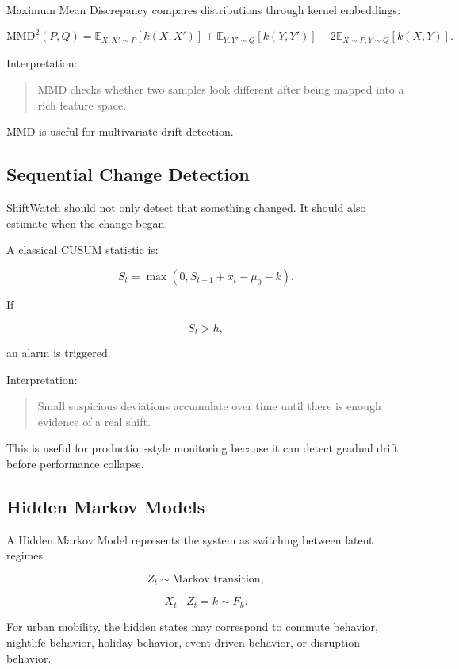 \documentclass[11pt]{article}
\begin{document}
Maximum Mean Discrepancy compares distributions through kernel embeddings:

\[
    \mathrm{MMD}^2(P,Q) =
    \mathbb{E}_{X,X'\sim P}[k(X,X')]
    + \mathbb{E}_{Y,Y'\sim Q}[k(Y,Y')]
    - 2\mathbb{E}_{X\sim P,Y\sim Q}[k(X,Y)].
\]

Interpretation:

\begin{quote}
    MMD checks whether two samples look different after being mapped into a rich feature space.
\end{quote}

MMD is useful for multivariate drift detection.

\subsection{Sequential Change Detection}

ShiftWatch should not only detect that something changed. It should also estimate when the change began.

A classical CUSUM statistic is:

\[
    S_t = \max(0, S_{t-1} + x_t - \mu_0 - k).
\]

If

\[
    S_t > h,
\]

an alarm is triggered.

Interpretation:

\begin{quote}
    Small suspicious deviations accumulate over time until there is enough evidence of a real shift.
\end{quote}

This is useful for production-style monitoring because it can detect gradual drift before performance collapse.

\subsection{Hidden Markov Models}

A Hidden Markov Model represents the system as switching between latent regimes.

\[
    Z_t \sim \text{Markov transition},
\]

\[
    X_t \mid Z_t = k \sim F_k.
\]

For urban mobility, the hidden states may correspond to commute behavior, nightlife behavior, holiday behavior, event-driven behavior, or disruption behavior.
\end{document}
